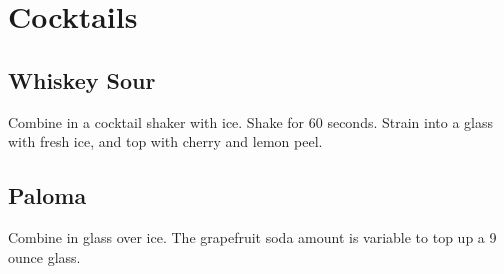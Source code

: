 \section{Cocktails}
\begin{recipe}

\subsection{Whiskey Sour}


Combine in a cocktail shaker with ice. Shake for 60 seconds. Strain into a glass 
with fresh ice, and top with cherry and lemon peel. 

\subsection{Paloma}


Combine in glass over ice. The grapefruit soda amount is variable to top up a 9 ounce glass. 

\end{recipe}
